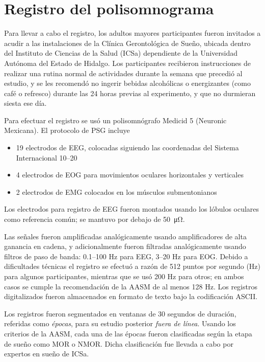 \section{Registro del polisomnograma}

Para llevar a cabo el registro, los adultos mayores participantes fueron invitados a acudir a las 
instalaciones de la Clínica Gerontológica de Sueño, ubicada dentro del Instituto de Ciencias de la 
Salud (ICSa) dependiente de la Universidad Autónoma del Estado de Hidalgo. Los participantes 
recibieron instrucciones de realizar una rutina normal de actividades durante la semana que 
precedió al estudio, y se les recomendó no ingerir bebidas alcohólicas o energizantes (como café 
o refresco) durante las 24 horas previas al experimento, y que no durmieran siesta ese día.

Para efectuar el registro se usó un polisomnógrafo Medicid 5 (Neuronic Mexicana). El protocolo de 
PSG incluye 
\begin{itemize}
\item 19 electrodos de EEG, colocadas siguiendo las coordenadas del Sistema Internacional 10--20
\item 4 electrodos de EOG para movimientos oculares horizontales y verticales
\item 2 electrodos de EMG colocados en los músculos submentonianos
\end{itemize}
%
Los electrodos para registro de EEG fueron montados usando los lóbulos oculares como referencia
común; se mantuvo por debajo de \SI{50}{\micro\ohm}.

Las señales fueron amplificadas analógicamente usando amplificadores de alta ganancia en cadena, 
y adicionalmente fueron filtradas analógicamente usando filtros de paso de banda: 0.1--100 Hz 
para EEG, 3--20 Hz para EOG. 
Debido a dificultades técnicas el registro se efectuó a razón de 512 puntos por segundo (Hz) para 
algunos participantes, mientras que se usó 200 Hz para otros; en ambos casos se cumple la 
recomendación de la AASM de al menos 128 Hz.
%
Los registros digitalizados fueron almacenados en formato de texto bajo la codificación 
ASCII.

Los registros fueron segmentados en ventanas de 30 segundos de duración, referidas como 
\textit{épocas}, para su estudio posterior \textit{fuera de línea}. 
Usando los criterios de la AASM, cada una de las épocas fueron clasificadas según la etapa
de sueño como MOR o NMOR. Dicha clasificación fue llevada a cabo por expertos en sueño de ICSa.

